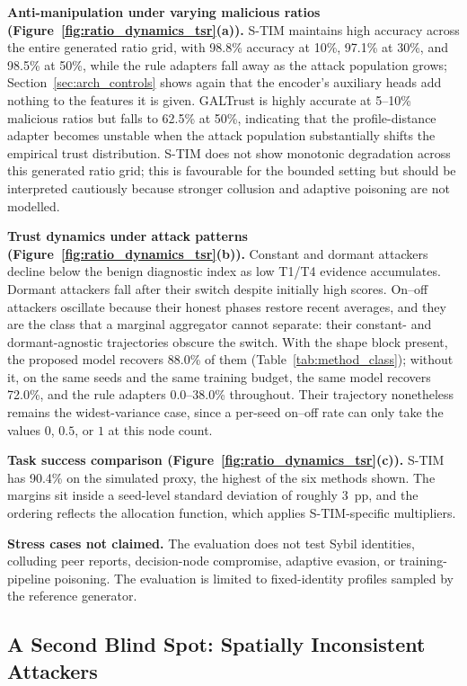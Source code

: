 \documentclass[notspecified,article,submit,moreauthors]{Definitions/mdpi}
\begin{document}
\textbf{Anti-manipulation under varying malicious ratios (Figure~\ref{fig:ratio_dynamics_tsr}(a)).}
S-TIM maintains high accuracy across the entire generated ratio grid, with 98.8\% accuracy at 10\%, 97.1\% at 30\%, and 98.5\% at 50\%, while the rule adapters fall away as the attack population grows; Section~\ref{sec:arch_controls} shows again that the encoder's auxiliary heads add nothing to the features it is given. GALTrust is highly accurate at 5--10\% malicious ratios but falls to 62.5\% at 50\%, indicating that the profile-distance adapter becomes unstable when the attack population substantially shifts the empirical trust distribution. S-TIM does not show monotonic degradation across this generated ratio grid; this is favourable for the bounded setting but should be interpreted cautiously because stronger collusion and adaptive poisoning are not modelled.

\textbf{Trust dynamics under attack patterns (Figure~\ref{fig:ratio_dynamics_tsr}(b)).}
Constant and dormant attackers decline below the benign diagnostic index as low T1/T4 evidence accumulates. Dormant attackers fall after their switch despite initially high scores. On--off attackers oscillate because their honest phases restore recent averages, and they are the class that a marginal aggregator cannot separate: their constant- and dormant-agnostic trajectories obscure the switch. With the shape block present, the proposed model recovers 88.0\% of them (Table~\ref{tab:method_class}); without it, on the same seeds and the same training budget, the same model recovers 72.0\%, and the rule adapters 0.0--38.0\% throughout. Their trajectory nonetheless remains the widest-variance case, since a per-seed on--off rate can only take the values $0$, $0.5$, or $1$ at this node count.

\textbf{Task success comparison (Figure~\ref{fig:ratio_dynamics_tsr}(c)).}
S-TIM has 90.4\% on the simulated proxy, the highest of the six methods shown. The margins sit inside a seed-level standard deviation of roughly 3~pp, and the ordering reflects the allocation function, which applies S-TIM-specific multipliers.\par

\textbf{Stress cases not claimed.}
The evaluation does not test Sybil identities, colluding peer reports, decision-node compromise, adaptive evasion, or training-pipeline poisoning. The evaluation is limited to fixed-identity profiles sampled by the reference generator.

\subsection{A Second Blind Spot: Spatially Inconsistent Attackers}
\label{sec:spatial_scenario}
\end{document}

